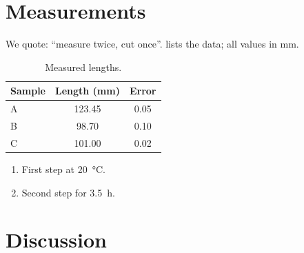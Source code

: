 \documentclass[11pt]{report}
\begin{document}
\tableofcontents
\chapter{Measurements}\label{c:m}
We quote: \enquote{measure twice, cut once}.
 lists the data; all values in \si{\milli\metre}.
\begin{table}[ht]\centering
\caption{Measured lengths.}\label{t:data}
\begin{tabular}{l S[table-format=3.2] S[table-format=1.2]}\toprule
Sample & {Length (\si{\milli\metre})} & {Error}\\\midrule
A & 123.45 & 0.05\\ B & 98.70 & 0.10\\ C & 101.00 & 0.02\\\bottomrule
\end{tabular}
\end{table}
\begin{enumerate}[label=(\alph*)]
\item First step at \SI{20}{\celsius}.
\item Second step for \SI{3.5}{\hour}.
\end{enumerate}
\lipsum[1-4]
\chapter{Discussion}
\lipsum[5-8]
\end{document}
